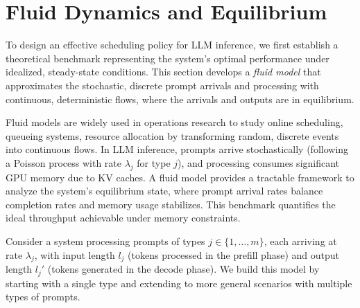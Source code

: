 \section{Fluid Dynamics and Equilibrium}\label{sec:fluid}
To design an effective scheduling policy for LLM inference, we first establish a theoretical benchmark representing the system's optimal performance under idealized, steady-state conditions. This section develops a \textit{fluid model} that approximates the stochastic, discrete prompt arrivals and processing with continuous, deterministic flows, where the arrivals and outputs are in equilibrium. 

Fluid models are widely used in operations research to study online scheduling, queueing systems, resource allocation by transforming random, discrete events into continuous flows. In LLM inference, prompts arrive stochastically (following a Poisson process with rate \(\lambda_j\) for type \(j\)), and processing consumes significant GPU memory due to KV caches. A fluid model provides a tractable framework to analyze the system's equilibrium state, where prompt arrival rates balance completion rates and memory usage stabilizes. This benchmark quantifies the ideal throughput achievable under memory constraints.

Consider a system processing prompts of types \(j \in \{1, \dots, m\}\), each arriving at rate \(\lambda_j\), with input length \(l_j\) (tokens processed in the prefill phase) and output length \(l_j'\) (tokens generated in the decode phase). We build this model by starting with a single type and extending to more general scenarios with multiple types of prompts.

